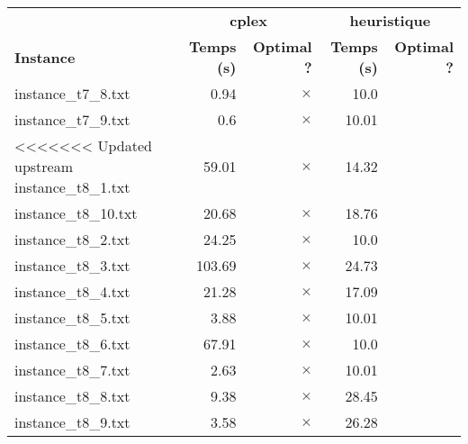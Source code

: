 \documentclass{article}
\begin{document}
\newpage
\begin{center}
\renewcommand{\arraystretch}{1.4} 
 \begin{tabular}{lrrrr}
	\hline
 & \multicolumn{2}{c}{\textbf{cplex}} & \multicolumn{2}{c}{\textbf{heuristique}}\\
\textbf{Instance}  & \textbf{Temps (s)} & \textbf{Optimal ?}  & \textbf{Temps (s)} & \textbf{Optimal ?} \\\hline

instance\_t7\_8.txt & 0.94 & 
$\times$
 & 10.0 & 
\\
instance\_t7\_9.txt & 0.6 & 
$\times$
 & 10.01 & 
\\
<<<<<<< Updated upstream
instance\_t8\_1.txt & 59.01 & 
$\times$
 & 14.32 & 
\\
instance\_t8\_10.txt & 20.68 & 
$\times$
 & 18.76 & 
\\
instance\_t8\_2.txt & 24.25 & 
$\times$
 & 10.0 & 
\\
instance\_t8\_3.txt & 103.69 & 
$\times$
 & 24.73 & 
\\
instance\_t8\_4.txt & 21.28 & 
$\times$
 & 17.09 & 
\\
instance\_t8\_5.txt & 3.88 & 
$\times$
 & 10.01 & 
\\
instance\_t8\_6.txt & 67.91 & 
$\times$
 & 10.0 & 
\\
instance\_t8\_7.txt & 2.63 & 
$\times$
 & 10.01 & 
\\
instance\_t8\_8.txt & 9.38 & 
$\times$
 & 28.45 & 
\\
instance\_t8\_9.txt & 3.58 & 
$\times$
 & 26.28 & 
\\


\end{tabular}
\end{center}
\end{document}
